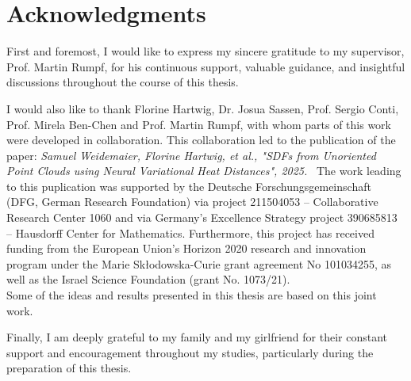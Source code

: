 \documentclass[12pt,openany]{book}
\theoremstyle{plainnormal}
\theoremstyle{remark}
\begin{document}
\section*{Acknowledgments}
\endgroup
First and foremost, I would like to express my sincere gratitude to my supervisor, Prof. Martin Rumpf, for his continuous support, valuable guidance, and insightful discussions throughout the course of this thesis.
\par
I would also like to thank Florine Hartwig, Dr. Josua Sassen, Prof. Sergio Conti, Prof. Mirela Ben-Chen and Prof. Martin Rumpf, with whom parts of this work were developed in collaboration. This collaboration led to the publication of the paper:
\vspace{0.5em}
\noindent
\textit{Samuel Weidemaier, Florine Hartwig, et al., "SDFs from Unoriented Point Clouds using Neural Variational
Heat Distances", 2025.}
\,
\vspace{0.5em}
The work leading to this puplication was supported by the Deutsche Forschungsgemeinschaft (DFG, German Research Foundation) via project 211504053 -- Collaborative Research Center 1060 and via Germany’s Excellence Strategy project 390685813 -- Hausdorff Center for Mathematics.
Furthermore, this project has received funding from the European Union’s Horizon 2020 research and innovation program under the Marie Skłodowska-Curie grant agreement No 101034255, as well as the Israel Science Foundation (grant No. 1073/21).\\
Some of the ideas and results presented in this thesis are based on this joint work.\par 
\noindent
Finally, I am deeply grateful to my family and my girlfriend for their constant support and encouragement throughout my studies, particularly during the preparation of this thesis.
\clearpage

\tableofcontents
 
\end{document}

